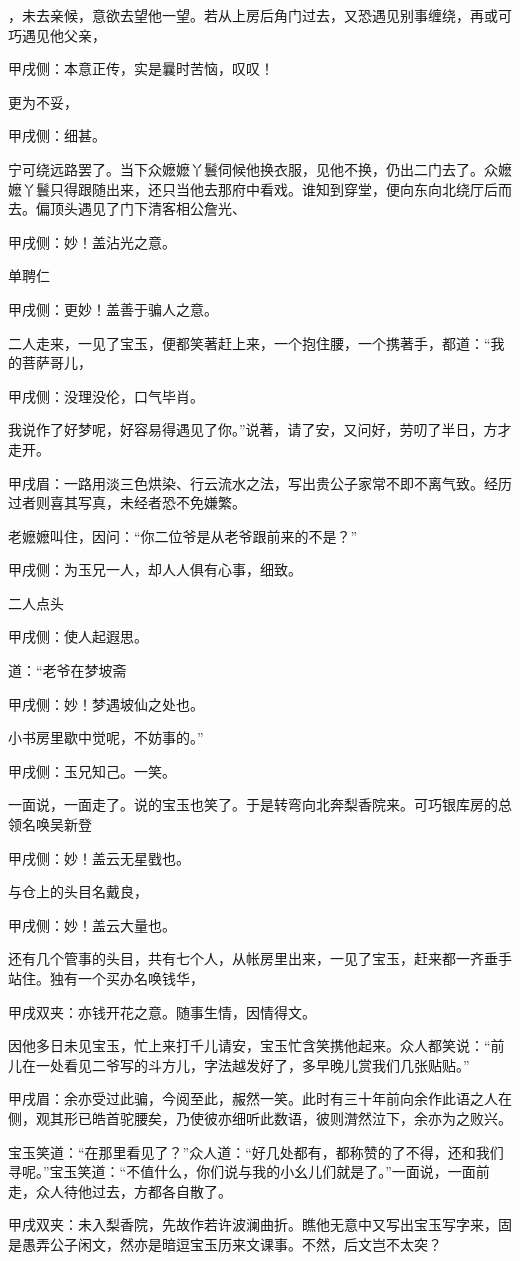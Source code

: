 \begin{parag}
，未去亲候，意欲去望他一望。若从上房后角门过去，又恐遇见别事缠绕，再或可巧遇见他父亲，\begin{note}甲戌侧：本意正传，实是曩时苦恼，叹叹！\end{note}更为不妥，\begin{note}甲戌侧：细甚。\end{note}宁可绕远路罢了。当下众嬷嬷丫鬟伺候他换衣服，见他不换，仍出二门去了。众嬷嬷丫鬟只得跟随出来，还只当他去那府中看戏。谁知到穿堂，便向东向北绕厅后而去。偏顶头遇见了门下清客相公詹光、\begin{note}甲戌侧：妙！盖沾光之意。\end{note}单聘仁\begin{note}甲戌侧：更妙！盖善于骗人之意。\end{note}二人走来，一见了宝玉，便都笑著赶上来，一个抱住腰，一个携著手，都道：“我的菩萨哥儿，\begin{note}甲戌侧：没理没伦，口气毕肖。\end{note}我说作了好梦呢，好容易得遇见了你。”说著，请了安，又问好，劳叨了半日，方才走开。\begin{note}甲戌眉：一路用淡三色烘染、行云流水之法，写出贵公子家常不即不离气致。经历过者则喜其写真，未经者恐不免嫌繁。\end{note}老嬷嬷叫住，因问：“你二位爷是从老爷跟前来的不是？”\begin{note}甲戌侧：为玉兄一人，却人人俱有心事，细致。\end{note}二人点头\begin{note}甲戌侧：使人起遐思。\end{note}道：“老爷在梦坡斋\begin{note}甲戌侧：妙！梦遇坡仙之处也。\end{note}小书房里歇中觉呢，不妨事的。”\begin{note}甲戌侧：玉兄知己。一笑。\end{note}一面说，一面走了。说的宝玉也笑了。于是转弯向北奔梨香院来。可巧银库房的总领名唤吴新登\begin{note}甲戌侧：妙！盖云无星戥也。\end{note}与仓上的头目名戴良，\begin{note}甲戌侧：妙！盖云大量也。\end{note}还有几个管事的头目，共有七个人，从帐房里出来，一见了宝玉，赶来都一齐垂手站住。独有一个买办名唤钱华，\begin{note}甲戌双夹：亦钱开花之意。随事生情，因情得文。\end{note}因他多日未见宝玉，忙上来打千儿请安，宝玉忙含笑携他起来。众人都笑说：“前儿在一处看见二爷写的斗方儿，字法越发好了，多早晚儿赏我们几张贴贴。”\begin{note}甲戌眉：余亦受过此骗，今阅至此，赧然一笑。此时有三十年前向余作此语之人在侧，观其形已皓首驼腰矣，乃使彼亦细听此数语，彼则潸然泣下，余亦为之败兴。\end{note}宝玉笑道：“在那里看见了？”众人道：“好几处都有，都称赞的了不得，还和我们寻呢。”宝玉笑道：“不值什么，你们说与我的小幺儿们就是了。”一面说，一面前走，众人待他过去，方都各自散了。\begin{note}甲戌双夹：未入梨香院，先故作若许波澜曲折。瞧他无意中又写出宝玉写字来，固是愚弄公子闲文，然亦是暗逗宝玉历来文课事。不然，后文岂不太突？\end{note}

\end{parag}
